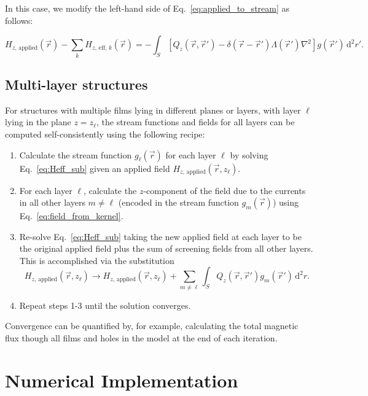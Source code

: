 \documentclass{article}
\begin{document}
In this case, we modify the left-hand side of Eq.~\ref{eq:applied_to_stream} as follows:

\begin{equation}
    \label{eq:Heff_sub}
    H_{z,\,\mathrm{applied}}(\vec{r}) - \sum_k H_{z,\,\mathrm{eff},\,k}(\vec{r})
    = -\int_S\left[
        Q_z(\vec{r},\vec{r}')-\delta(\vec{r}-\vec{r}')\Lambda(\vec{r}')\nabla^2\right
    ]g(\vec{r}')\,\mathrm{d}^2r'.
\end{equation}

\subsection{Multi-layer structures}
\label{section:model:multilayer}

For structures with multiple films lying in different planes or layers, with layer $\ell$ lying in the plane $z=z_\ell$,
the stream functions and fields for all layers can be computed self-consistently using the following recipe:

\begin{enumerate}
    \item{
        Calculate the stream function $g_\ell(\vec{r})$ for each layer $\ell$ by solving Eq.~\ref{eq:Heff_sub} given an applied field $H_{z,\,\mathrm{applied}}(\vec{r}, z_\ell)$.
    }
    \item{
        For each layer $\ell$, calculate the $z$-component of the field due to the currents in all other layers $m\neq\ell$ (encoded in the stream function $g_m(\vec{r})$)
        using Eq.~\ref{eq:field_from_kernel}.
    }
    \item{
        Re-solve Eq.~\ref{eq:Heff_sub} taking the new applied field at each layer to be the original applied field plus the sum of screening fields from all other layers. This is accomplished via the substitution
        $$
            H_{z,\,\mathrm{applied}}(\vec{r}, z_\ell) \to
            H_{z,\,\mathrm{applied}}(\vec{r}, z_\ell)
            + \sum_{m\neq\ell}
            \int_S Q_z(\vec{r},\vec{r}')g_m(\vec{r}')\,\mathrm{d}^2r.
        $$
    }
    \item{
        Repeat steps 1-3 until the solution converges.
    }
\end{enumerate}

Convergence can be quantified by, for example, calculating the total magnetic flux though all films and holes in the model at the end of each iteration.

\section{Numerical Implementation}
\label{section:implementation}
\end{document}
